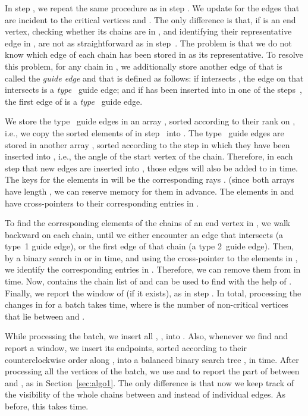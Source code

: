 \documentclass[11pt, a4paper]{article}
\begin{document}
In step , we repeat the same procedure
as in step . We update  for the edges that are incident
to the critical vertices  
and . The only difference is that, if  is an end vertex,
checking whether its chains are in , and identifying
their representative edge in , are not as straightforward as in step~.
The problem is that we do not know which edge of each
chain has been stored in  as its representative. To resolve this problem,
for any chain  in , we additionally store another edge of 
that is called the \emph{guide edge} and that is defined as follows:
if  intersects , the edge on  that intersects 
is a \emph{type~} guide edge;
and if  has been inserted into  in one of the
steps~, the first edge of  is a \emph{type~} guide edge.

We store the type~ guide edges in an array , sorted according
to their rank on , i.e., we copy the sorted elements of  in step~ 
into .
The type~ guide edges are stored in another array ,
sorted according to the step in which they have been inserted into , 
i.e., the angle of the start vertex of the chain.
Therefore, in each step that new edges are inserted into , 
those edges will also be added to  in  time.
The keys for the elements in  will be the corresponding rays
. (since
both arrays have length , we can reserve memory for them
in advance.
The elements in  and  have 
cross-pointers to their corresponding entries in .

To find the corresponding elements of the chains of an end vertex
 in , we walk backward on each chain, until
we either encounter an edge that intersects  (a type~1 guide edge),
or the first edge of that chain (a type 2~guide edge). 
Then, by a binary search in  or  in  time,
and using the cross-pointer to the elements in , we identify 
the corresponding entries in .
Therefore, we can remove them from  in  time.
Now,  contains the chain list of  and can be used
to find  with the help of . Finally, we
report the window of  (if it exists), as in step .
In total, processing the changes in  for a batch 
takes  time, where 
 is the number of non-critical vertices that lie between 
 and .

While processing the batch, we insert all , 
, into . Also, whenever we find and report 
a window, we insert its endpoints, sorted according to their 
counterclockwise order along , into a balanced binary search 
tree , in  time. After processing all the vertices 
of the batch, we use  and  to report the part of 
 between  and , as in 
Section~\ref{sec:algo1}. The only difference is that now we 
keep track of the visibility of the whole chains between  and 
instead of individual edges. As before, this takes  time.
\end{document}
